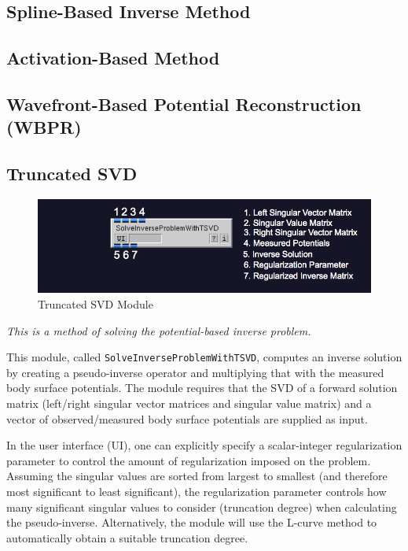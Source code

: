 \subsection{Spline-Based Inverse Method}

\subsection{Activation-Based Method}

\subsection{Wavefront-Based Potential Reconstruction (WBPR)}


\newpage

\subsection{Truncated SVD}

\begin{figure}[H]
\begin{center}
\includegraphics[width=\textwidth]{ECGToolkitGuide_figures/SolveInverseProblemWithTSVD.png}
\caption{Truncated SVD Module}
\label{tsvd}
\end{center}
\end{figure}

\vspace{5pt}\textit{This is a method of solving the potential-based inverse problem.}\vspace{5pt}

This module, called {\tt SolveInverseProblemWithTSVD}, computes an inverse solution by creating a pseudo-inverse operator and multiplying that with the measured body surface potentials. The module requires that the SVD of a forward solution matrix (left/right singular vector matrices and singular value matrix) and a vector of observed/measured body surface potentials are supplied as input.

In the user interface (UI), one can explicitly specify a scalar-integer regularization parameter to control the amount of regularization imposed on the problem. Assuming the singular values are sorted from largest to smallest (and therefore most significant to least significant), the regularization parameter controls how many significant singular values to consider (truncation degree) when calculating the pseudo-inverse. Alternatively, the module will use the L-curve method to automatically obtain a suitable truncation degree.

